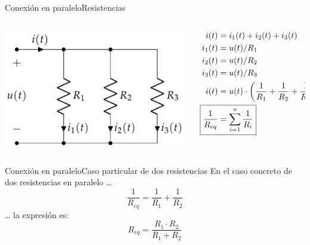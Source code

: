 \documentclass[aspectratio=169, xcolor={usenames,svgnames,dvipsnames}]{beamer}
\begin{document}
\begin{frame}{Conexión en paralelo}{Resistencias}
\begin{columns}
\begin{column}{0.4\columnwidth}
\begin{center}
\includegraphics[width=.9\linewidth]{../figs/AsociacionParalelo.pdf}
\end{center}
\end{column}
\begin{column}{0.6\columnwidth}
\begin{align*}
  i(t)& = i_1(t) + i_2(t) + i_3(t)\\
  i_1(t) &= u(t)/R_1\\
  i_2(t) &= u(t)/R_2\\
  i_3(t) &= u(t)/R_3\\
  i(t) &= u(t) \cdot \left(\frac{1}{R_1} + \frac{1}{R_2} + \frac{1}{R_3}\right)\\
  \Aboxed{\frac{1}{R_{eq}} &= \sum_{i = 1}^n \frac{1}{R_i}}
\end{align*}
\end{column}
\end{columns}
\end{frame}

\begin{frame}{Conexión en paralelo}{Caso particular de dos resistencias}
En el caso concreto de \alert{dos} resistencias en paralelo \ldots{}
\begin{equation*}
  \frac{1}{R_{eq}} = \frac{1}{R_1} + \frac{1}{R_2}
\end{equation*}
\ldots{} la expresión es:
\begin{equation*}
  \boxed{R_{eq} = \frac{R_1 \cdot R_2}{R_1 + R_2}}
\end{equation*}
\end{frame}
\end{document}
